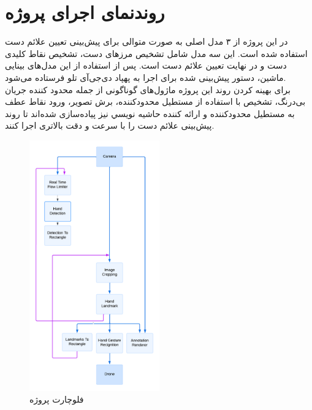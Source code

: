 \section[روندنمای اجرای پروژه]{روندنمای \protect{} اجرای پروژه}
در این پروژه از ۳ مدل اصلی به صورت متوالی برای پیش‌بینی تعیین علائم دست استفاده شده‌ است. این سه مدل شامل تشخیص مرز‌های دست، تشخیص نقاط کلیدی دست و در نهایت تعیین علائم دست است. پس از استفاده از این مدل‌های بینایی ماشین، دستور پیش‌بینی شده برای اجرا به پهپاد دی‌جی‌آی تلو فرستاده می‌شود.
\\
برای بهینه کردن روند این پروژه ماژول‌های گوناگونی از جمله محدود كننده جريان بی‌درنگ، تشخيص با استفاده از مستطيل محدودکننده، برش تصوير،  ورود نقاط عطف به مستطيل محدودکننده و ارائه كننده حاشيه نويسي نیز پیاده‌سازی شده‌اند تا روند پیش‌بینی علائم دست را با سرعت و دقت بالاتری اجرا کنند.

\begin{figure}[h]
    \centering
    \includegraphics[width=0.5\textwidth]{flowchart.png}
    \caption{فلوچارت پروژه}
\end{figure}




